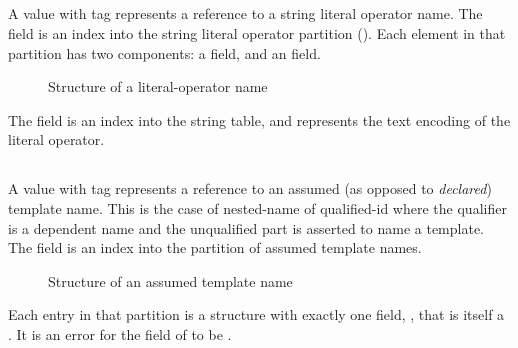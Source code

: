 
\subsection{}
\label{sec:ifc:NameSort:Literal}

A  value with tag  represents a reference to a string literal operator name.
The  field is an index into the string literal operator partition (). Each element in that
partition has two components: a  field, and an  field. 
%
\begin{figure}[H]
	\centering
	\caption{Structure of a literal-operator name}
	\label{fig:ifc-literal-operator-name-structure}
\end{figure}
The  field is an index into the string table, and represents the text encoding of the literal operator.



\subsection{}
\label{sec:ifc:NameSort:Template}

A  value with tag  represents a reference
to an assumed (as opposed to \emph{declared}) template name.  This is the case of nested-name of qualified-id where
the qualifier is a dependent name and the unqualified part is asserted to name a template.
The  field is an index into the partition of assumed template names.
%
\begin{figure}[H]
	\centering
	\caption{Structure of an assumed template name}
	\label{fig:ifc-assumed-template-name-structure}
\end{figure}
%
Each entry in that partition is a structure with exactly one field, , that is itself a . 
It is an error for the  field of  to be .

